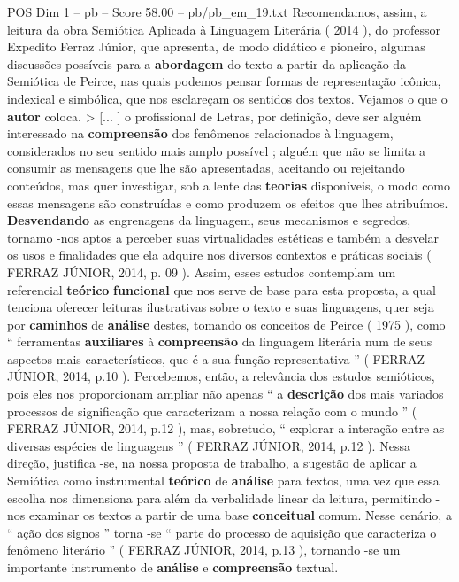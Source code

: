 \begin{textsample}{POS Dim 1 – pb – Score 58.00 – pb/pb\_em\_19.txt}
Recomendamos, assim, a leitura da obra Semiótica Aplicada à Linguagem Literária ( 2014 ), do professor Expedito Ferraz Júnior, que apresenta, de modo didático e pioneiro, algumas discussões possíveis para a \textbf{abordagem} do texto a partir da aplicação da Semiótica de Peirce, nas quais podemos pensar formas de representação icônica, indexical e simbólica, que nos esclareçam os sentidos dos textos.
Vejamos o que o \textbf{autor} coloca. > [... ] o profissional de Letras, por definição, deve ser alguém interessado na \textbf{compreensão} dos fenômenos relacionados à linguagem, considerados no seu sentido mais amplo possível ; alguém que não se limita a consumir as mensagens que lhe são apresentadas, aceitando ou rejeitando conteúdos, mas quer investigar, sob a lente das \textbf{teorias} disponíveis, o modo como essas mensagens são construídas e como produzem os efeitos que lhes atribuímos. \textbf{Desvendando} as engrenagens da linguagem, seus mecanismos e segredos, tornamo -nos aptos a perceber suas virtualidades estéticas e também a desvelar os usos e finalidades que ela adquire nos diversos contextos e práticas sociais ( FERRAZ JÚNIOR, 2014, p. 09 ).
Assim, esses estudos contemplam um referencial \textbf{teórico} \textbf{funcional} que nos serve de base para esta proposta, a qual tenciona oferecer leituras ilustrativas sobre o texto e suas linguagens, quer seja por \textbf{caminhos} de \textbf{análise} destes, tomando os conceitos de Peirce ( 1975 ), como “ ferramentas \textbf{auxiliares} à \textbf{compreensão} da linguagem literária num de seus aspectos mais característicos, que é a sua função representativa ” ( FERRAZ JÚNIOR, 2014, p.10 ).
Percebemos, então, a relevância dos estudos semióticos, pois eles nos proporcionam ampliar não apenas “ a \textbf{descrição} dos mais variados processos de significação que caracterizam a nossa relação com o mundo ” ( FERRAZ JÚNIOR, 2014, p.12 ), mas, sobretudo, “ explorar a interação entre as diversas espécies de linguagens ” ( FERRAZ JÚNIOR, 2014, p.12 ).
Nessa direção, justifica -se, na nossa proposta de trabalho, a sugestão de aplicar a Semiótica como instrumental \textbf{teórico} de \textbf{análise} para textos, uma vez que essa escolha nos dimensiona para além da verbalidade linear da leitura, permitindo -nos examinar os textos a partir de uma base \textbf{conceitual} comum.
Nesse cenário, a “ ação dos signos ” torna -se “ parte do processo de aquisição que caracteriza o fenômeno literário ” ( FERRAZ JÚNIOR, 2014, p.13 ), tornando -se um importante instrumento de \textbf{análise} e \textbf{compreensão} textual.

\end{textsample}

